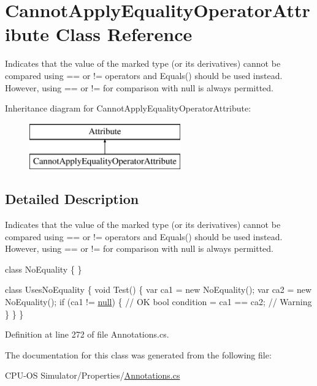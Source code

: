 \hypertarget{class_cannot_apply_equality_operator_attribute}{}\section{Cannot\+Apply\+Equality\+Operator\+Attribute Class Reference}
\label{class_cannot_apply_equality_operator_attribute}


Indicates that the value of the marked type (or its derivatives) cannot be compared using \textquotesingle{}==\textquotesingle{} or \textquotesingle{}!=\textquotesingle{} operators and {\ttfamily Equals()} should be used instead. However, using \textquotesingle{}==\textquotesingle{} or \textquotesingle{}!=\textquotesingle{} for comparison with {\ttfamily null} is always permitted.  


Inheritance diagram for Cannot\+Apply\+Equality\+Operator\+Attribute\+:\begin{figure}[H]
\begin{center}
\leavevmode
\includegraphics[height=2.000000cm]{class_cannot_apply_equality_operator_attribute}
\end{center}
\end{figure}


\subsection{Detailed Description}
Indicates that the value of the marked type (or its derivatives) cannot be compared using \textquotesingle{}==\textquotesingle{} or \textquotesingle{}!=\textquotesingle{} operators and {\ttfamily Equals()} should be used instead. However, using \textquotesingle{}==\textquotesingle{} or \textquotesingle{}!=\textquotesingle{} for comparison with {\ttfamily null} is always permitted. 


\begin{DoxyCode}
[CannotApplyEqualityOperator]
\textcolor{keyword}{class }NoEquality \{ \}

\textcolor{keyword}{class }UsesNoEquality \{
  \textcolor{keywordtype}{void} Test() \{
    var ca1 = \textcolor{keyword}{new} NoEquality();
    var ca2 = \textcolor{keyword}{new} NoEquality();
    \textcolor{keywordflow}{if} (ca1 != \hyperlink{_old_01_process_01_flags_8cs_afb8e110345c45e74478894341ab6b28e}{null}) \{ \textcolor{comment}{// OK}
      \textcolor{keywordtype}{bool} condition = ca1 == ca2; \textcolor{comment}{// Warning}
    \}
  \}
\}
\end{DoxyCode}


Definition at line 272 of file Annotations.\+cs.



The documentation for this class was generated from the following file\+:\begin{DoxyCompactItemize}
\item 
C\+P\+U-\/\+O\+S Simulator/\+Properties/\hyperlink{_annotations_8cs}{Annotations.\+cs}\end{DoxyCompactItemize}
